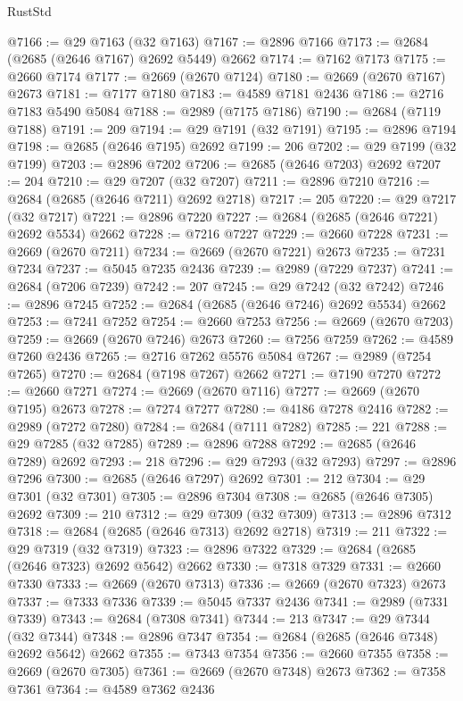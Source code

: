 \begin{lexlean}{RustStd}
\begin{coremodule}
@7166 := @29 @7163 (@32 @7163)
@7167 := @2896 @7166
@7173 := @2684 (@2685 (@2646 @7167) @2692 @5449) @2662
@7174 := @7162 @7173
@7175 := @2660 @7174
@7177 := @2669 (@2670 @7124)
@7180 := @2669 (@2670 @7167) @2673
@7181 := @7177 @7180
@7183 := @4589 @7181 @2436
@7186 := @2716 @7183 @5490 @5084
@7188 := @2989 (@7175 @7186)
@7190 := @2684 (@7119 @7188)
@7191 := 209
@7194 := @29 @7191 (@32 @7191)
@7195 := @2896 @7194
@7198 := @2685 (@2646 @7195) @2692
@7199 := 206
@7202 := @29 @7199 (@32 @7199)
@7203 := @2896 @7202
@7206 := @2685 (@2646 @7203) @2692
@7207 := 204
@7210 := @29 @7207 (@32 @7207)
@7211 := @2896 @7210
@7216 := @2684 (@2685 (@2646 @7211) @2692 @2718)
@7217 := 205
@7220 := @29 @7217 (@32 @7217)
@7221 := @2896 @7220
@7227 := @2684 (@2685 (@2646 @7221) @2692 @5534) @2662
@7228 := @7216 @7227
@7229 := @2660 @7228
@7231 := @2669 (@2670 @7211)
@7234 := @2669 (@2670 @7221) @2673
@7235 := @7231 @7234
@7237 := @5045 @7235 @2436
@7239 := @2989 (@7229 @7237)
@7241 := @2684 (@7206 @7239)
@7242 := 207
@7245 := @29 @7242 (@32 @7242)
@7246 := @2896 @7245
@7252 := @2684 (@2685 (@2646 @7246) @2692 @5534) @2662
@7253 := @7241 @7252
@7254 := @2660 @7253
@7256 := @2669 (@2670 @7203)
@7259 := @2669 (@2670 @7246) @2673
@7260 := @7256 @7259
@7262 := @4589 @7260 @2436
@7265 := @2716 @7262 @5576 @5084
@7267 := @2989 (@7254 @7265)
@7270 := @2684 (@7198 @7267) @2662
@7271 := @7190 @7270
@7272 := @2660 @7271
@7274 := @2669 (@2670 @7116)
@7277 := @2669 (@2670 @7195) @2673
@7278 := @7274 @7277
@7280 := @4186 @7278 @2416
@7282 := @2989 (@7272 @7280)
@7284 := @2684 (@7111 @7282)
@7285 := 221
@7288 := @29 @7285 (@32 @7285)
@7289 := @2896 @7288
@7292 := @2685 (@2646 @7289) @2692
@7293 := 218
@7296 := @29 @7293 (@32 @7293)
@7297 := @2896 @7296
@7300 := @2685 (@2646 @7297) @2692
@7301 := 212
@7304 := @29 @7301 (@32 @7301)
@7305 := @2896 @7304
@7308 := @2685 (@2646 @7305) @2692
@7309 := 210
@7312 := @29 @7309 (@32 @7309)
@7313 := @2896 @7312
@7318 := @2684 (@2685 (@2646 @7313) @2692 @2718)
@7319 := 211
@7322 := @29 @7319 (@32 @7319)
@7323 := @2896 @7322
@7329 := @2684 (@2685 (@2646 @7323) @2692 @5642) @2662
@7330 := @7318 @7329
@7331 := @2660 @7330
@7333 := @2669 (@2670 @7313)
@7336 := @2669 (@2670 @7323) @2673
@7337 := @7333 @7336
@7339 := @5045 @7337 @2436
@7341 := @2989 (@7331 @7339)
@7343 := @2684 (@7308 @7341)
@7344 := 213
@7347 := @29 @7344 (@32 @7344)
@7348 := @2896 @7347
@7354 := @2684 (@2685 (@2646 @7348) @2692 @5642) @2662
@7355 := @7343 @7354
@7356 := @2660 @7355
@7358 := @2669 (@2670 @7305)
@7361 := @2669 (@2670 @7348) @2673
@7362 := @7358 @7361
@7364 := @4589 @7362 @2436

\end{coremodule}
\end{lexlean}
